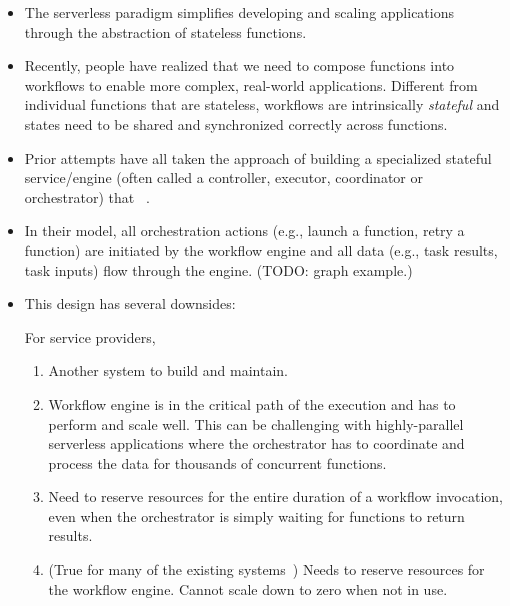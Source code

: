 \begin{itemize}
  \item The serverless paradigm simplifies developing and scaling applications
  through the abstraction of stateless functions.

  \item Recently, people have realized that we need to compose functions into
  workflows to enable more complex, real-world applications. Different from
  individual functions that are stateless, workflows are intrinsically
  \emph{stateful} and states need to be shared and synchronized correctly
  across functions.

  \item Prior attempts have all taken the approach of building a specialized
  stateful service/engine (often called a controller, executor, coordinator or
  orchestrator) that ~\cite{gg-atc, excamera, kappa,
  triggerflow, pywren, durable-functions, aws-step-functions,
  google-cloud-composer, google-workflows}.

  \item In their model, all orchestration actions (e.g., launch a function,
  retry a function) are initiated by the workflow engine and all data (e.g.,
  task results, task inputs) flow through the engine. (TODO:
  graph example.)

  \item This design has several downsides:

  For service providers,

  \begin{enumerate}
    \item Another system to build and maintain.

    \item Workflow engine is in the critical path of the execution and has to
    perform and scale well. This can be challenging with highly-parallel
    serverless applications where the orchestrator has to coordinate and
    process the data for thousands of concurrent functions.

    \item Need to reserve resources for the entire duration of a workflow
    invocation, even when the orchestrator is simply waiting for functions to
    return results.

    \item (True for many of the existing systems~\cite{gg-atc,excamera, kappa,
    pywren}) Needs to reserve resources for the workflow engine. Cannot scale
    down to zero when not in use.
  \end{enumerate}


\end{itemize}
